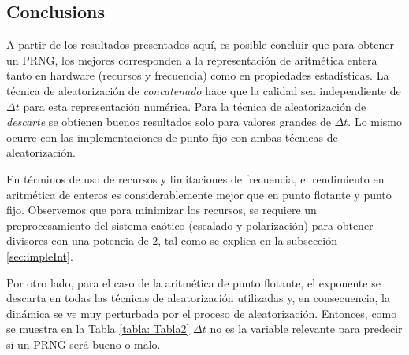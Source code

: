 \subsection{Conclusions}
\label{sec:conclusions}

A partir de los resultados presentados aquí, es posible concluir que para obtener un PRNG, los mejores corresponden a la representación de aritmética entera tanto en hardware (recursos y frecuencia) como en propiedades estadísticas.
La técnica de aleatorización de \textit{concatenado} hace que la calidad sea independiente de $\Delta t$ para esta representación numérica.
Para la técnica de aleatorización de \textit{descarte} se obtienen buenos resultados solo para valores grandes de $\Delta t$.
Lo mismo ocurre con las implementaciones de punto fijo con ambas técnicas de aleatorización.

En términos de uso de recursos y limitaciones de frecuencia, el rendimiento en aritmética de enteros es considerablemente mejor que en punto flotante y punto fijo.
Observemos que para minimizar los recursos, se requiere un preprocesamiento del sistema caótico (escalado y polarización) para obtener divisores con una potencia de $2$, tal como se explica en la subsección \ref{sec:impleInt}.

Por otro lado, para el caso de la aritmética de punto flotante, el exponente se descarta en todas las técnicas de aleatorización utilizadas y, en consecuencia, la dinámica se ve muy perturbada por el proceso de aleatorización.
Entonces, como se muestra en la Tabla \ref{tabla: Tabla2} $\Delta t $ no es la variable relevante para predecir si un PRNG será bueno o malo.